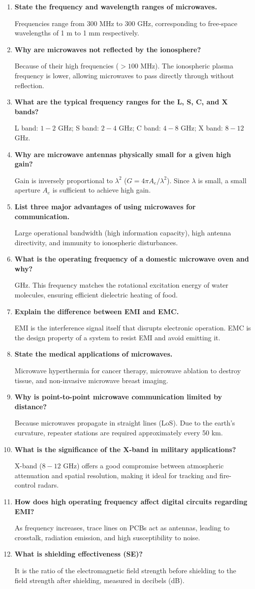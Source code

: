 \documentclass[12pt,a4paper]{article}
\newcommand{\Q}[1]{\textbf{#1}\par\noindent\ignorespaces}
\begin{document}
\begin{tcolorbox}[exambox, title={\textbf{Frequently Asked / Viva Questions}}]
\begin{enumerate}[topsep=0pt, label=\textbf{Q\arabic*.}, itemsep=5pt]
  \item \Q{State the frequency and wavelength ranges of microwaves.}
    Frequencies range from 300 MHz to 300 GHz, corresponding to free-space wavelengths of 1 m to 1 mm respectively.
  \item \Q{Why are microwaves not reflected by the ionosphere?}
    Because of their high frequencies ($>100$ MHz). The ionospheric plasma frequency is lower, allowing microwaves to pass directly through without reflection.
  \item \Q{What are the typical frequency ranges for the L, S, C, and X bands?}
    L band: $1 - 2$ GHz; S band: $2 - 4$ GHz; C band: $4 - 8$ GHz; X band: $8 - 12$ GHz.
  \item \Q{Why are microwave antennas physically small for a given high gain?}
    Gain is inversely proportional to $\lambda^2$ ($G = 4\pi A_e/\lambda^2$). Since $\lambda$ is small, a small aperture $A_e$ is sufficient to achieve high gain.
  \item \Q{List three major advantages of using microwaves for communication.}
    Large operational bandwidth (high information capacity), high antenna directivity, and immunity to ionospheric disturbances.
  \item \Q{What is the operating frequency of a domestic microwave oven and why?}
    2.45 GHz. This frequency matches the rotational excitation energy of water molecules, ensuring efficient dielectric heating of food.
  \item \Q{Explain the difference between EMI and EMC.}
    EMI is the interference signal itself that disrupts electronic operation. EMC is the design property of a system to resist EMI and avoid emitting it.
  \item \Q{State the medical applications of microwaves.}
    Microwave hyperthermia for cancer therapy, microwave ablation to destroy tissue, and non-invasive microwave breast imaging.
  \item \Q{Why is point-to-point microwave communication limited by distance?}
    Because microwaves propagate in straight lines (LoS). Due to the earth's curvature, repeater stations are required approximately every 50 km.
  \item \Q{What is the significance of the X-band in military applications?}
    X-band ($8 - 12$ GHz) offers a good compromise between atmospheric attenuation and spatial resolution, making it ideal for tracking and fire-control radars.
  \item \Q{How does high operating frequency affect digital circuits regarding EMI?}
    As frequency increases, trace lines on PCBs act as antennas, leading to crosstalk, radiation emission, and high susceptibility to noise.
  \item \Q{What is shielding effectiveness (SE)?}
    It is the ratio of the electromagnetic field strength before shielding to the field strength after shielding, measured in decibels (dB).
\end{enumerate}
\end{tcolorbox}
\end{document}
